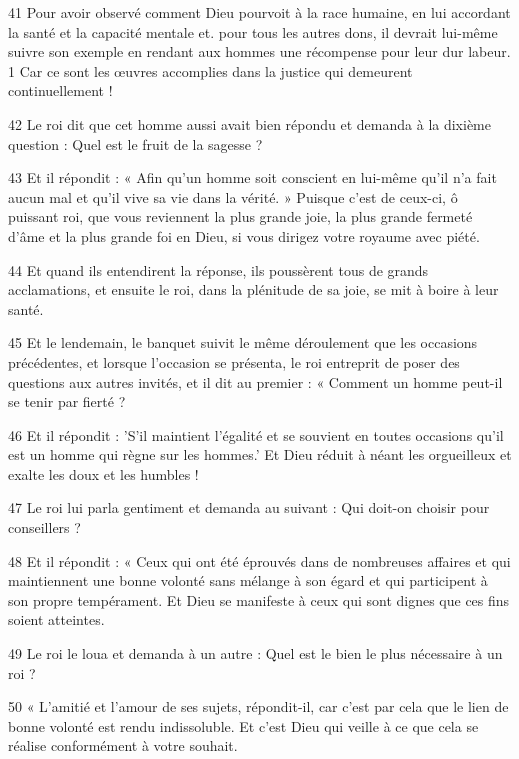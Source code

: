 \par 41 Pour avoir observé comment Dieu pourvoit à la race humaine, en lui accordant la santé et la capacité mentale et. pour tous les autres dons, il devrait lui-même suivre son exemple en rendant aux hommes une récompense pour leur dur labeur. 1 Car ce sont les œuvres accomplies dans la justice qui demeurent continuellement !

\par 42 Le roi dit que cet homme aussi avait bien répondu et demanda à la dixième question : Quel est le fruit de la sagesse ?

\par 43 Et il répondit : « Afin qu'un homme soit conscient en lui-même qu'il n'a fait aucun mal et qu'il vive sa vie dans la vérité. » Puisque c'est de ceux-ci, ô puissant roi, que vous reviennent la plus grande joie, la plus grande fermeté d'âme et la plus grande foi en Dieu, si vous dirigez votre royaume avec piété.

\par 44 Et quand ils entendirent la réponse, ils poussèrent tous de grands acclamations, et ensuite le roi, dans la plénitude de sa joie, se mit à boire à leur santé.

\par 45 Et le lendemain, le banquet suivit le même déroulement que les occasions précédentes, et lorsque l'occasion se présenta, le roi entreprit de poser des questions aux autres invités, et il dit au premier : « Comment un homme peut-il se tenir par fierté ?

\par 46 Et il répondit : 'S'il maintient l'égalité et se souvient en toutes occasions qu'il est un homme qui règne sur les hommes.' Et Dieu réduit à néant les orgueilleux et exalte les doux et les humbles !

\par 47 Le roi lui parla gentiment et demanda au suivant : Qui doit-on choisir pour conseillers ?

\par 48 Et il répondit : « Ceux qui ont été éprouvés dans de nombreuses affaires et qui maintiennent une bonne volonté sans mélange à son égard et qui participent à son propre tempérament. Et Dieu se manifeste à ceux qui sont dignes que ces fins soient atteintes.

\par 49 Le roi le loua et demanda à un autre : Quel est le bien le plus nécessaire à un roi ?

\par 50 « L'amitié et l'amour de ses sujets, répondit-il, car c'est par cela que le lien de bonne volonté est rendu indissoluble. Et c'est Dieu qui veille à ce que cela se réalise conformément à votre souhait.

